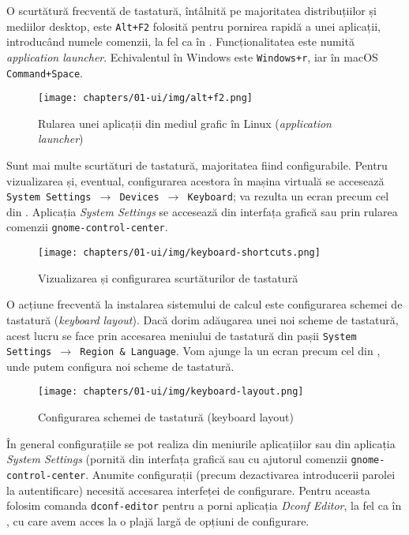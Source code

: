 O scurtătură frecventă de tastatură, întâlnită pe majoritatea distribuțiilor și mediilor desktop, este \texttt{Alt+F2} folosită pentru pornirea rapidă a unei aplicații, introducând numele comenzii, la fel ca în .
Funcționalitatea este numită \textit{application launcher}.
Echivalentul în Windows este \texttt{Windows+r}, iar în macOS \texttt{Command+Space}.

\begin{figure}[!htbp]
  \centering
  \texttt{[image: chapters/01-ui/img/alt+f2.png]}
  \caption{Rularea unei aplicații din mediul grafic în Linux (\textit{application launcher})}
  \label{fig:ui:app-launcher}
\end{figure}

Sunt mai multe scurtături de tastatură, majoritatea fiind configurabile.
Pentru vizualizarea și, eventual, configurarea acestora în mașina virtuală se accesează \texttt{System Settings $\rightarrow$ Devices $\rightarrow$ Keyboard};
va rezulta un ecran precum cel din .
Aplicația \textit{System Settings} se accesează din interfața grafică sau prin rularea comenzii \texttt{gnome-control-center}.

\begin{figure}[!htbp]
  \centering
  \texttt{[image: chapters/01-ui/img/keyboard-shortcuts.png]}
  \caption{Vizualizarea și configurarea scurtăturilor de tastatură}
  \label{fig:ui:keyboard-shortcuts}
\end{figure}

O acțiune frecventă la instalarea sistemului de calcul este configurarea schemei de tastatură (\textit{keyboard layout}).
Dacă dorim adăugarea unei noi scheme de tastatură, acest lucru se face prin accesarea meniului de tastatură din pașii \texttt{System Settings $\rightarrow$ Region \& Language}.
Vom ajunge la un ecran precum cel din , unde putem configura noi scheme de tastatură.

\begin{figure}[!htbp]
  \centering
  \texttt{[image: chapters/01-ui/img/keyboard-layout.png]}
  \caption{Configurarea schemei de tastatură (keyboard layout)}
  \label{fig:ui:keyboard-layout}
\end{figure}

În general configurațiile se pot realiza din meniurile aplicațiilor sau din aplicația \textit{System Settings} (pornită din interfața grafică sau cu ajutorul comenzii \texttt{gnome-control-center}.
Anumite configurații (precum dezactivarea introducerii parolei la autentificare) necesită accesarea interfeței de configurare.
Pentru aceasta folosim comanda \texttt{dconf-editor} pentru a porni aplicația \textit{Dconf Editor}, la fel ca în , cu care avem acces la o plajă largă de opțiuni de configurare.

